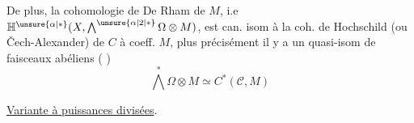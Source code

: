 
De plus, la cohomologie de De Rham de $M$, i.e $\mathbb H^{\unsure{\alpha|*}}(X,\bigwedge^{\unsure{\alpha|2|*}}\Omega\otimes M)$, est can. isom à la coh. de Hochschild (ou Čech-Alexander) de $C$ à coeff.  $M$, plus précisément il y a un quasi-isom  de  faisceaux abéliens ( )
\[
\bigwedge^*\Omega\otimes M\simeq C^*(\mathcal C,M)
\]

\uline{Variante à puissances divisées}.


